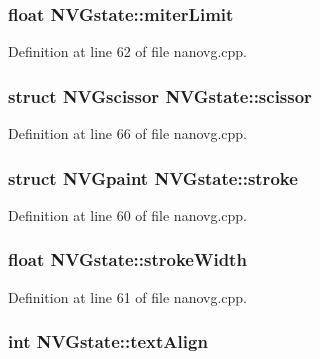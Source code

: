 \hypertarget{struct_n_v_gstate_a274ff13d3a13ed64b17f45eed44ff02a}{
\subsubsection[{miter\+Limit}]{\setlength{\rightskip}{0pt plus 5cm}float N\+V\+Gstate\+::miter\+Limit}}\label{struct_n_v_gstate_a274ff13d3a13ed64b17f45eed44ff02a}


Definition at line 62 of file nanovg.\+cpp.

\hypertarget{struct_n_v_gstate_a75bd77e78aa4304e0e019933fd3307ab}{
\subsubsection[{scissor}]{\setlength{\rightskip}{0pt plus 5cm}struct {\bf N\+V\+Gscissor} N\+V\+Gstate\+::scissor}}\label{struct_n_v_gstate_a75bd77e78aa4304e0e019933fd3307ab}


Definition at line 66 of file nanovg.\+cpp.

\hypertarget{struct_n_v_gstate_a0423f044a0ef4445270156232c88b340}{
\subsubsection[{stroke}]{\setlength{\rightskip}{0pt plus 5cm}struct {\bf N\+V\+Gpaint} N\+V\+Gstate\+::stroke}}\label{struct_n_v_gstate_a0423f044a0ef4445270156232c88b340}


Definition at line 60 of file nanovg.\+cpp.

\hypertarget{struct_n_v_gstate_a0266a3e8c86c689a7eba07cf1b8adac2}{
\subsubsection[{stroke\+Width}]{\setlength{\rightskip}{0pt plus 5cm}float N\+V\+Gstate\+::stroke\+Width}}\label{struct_n_v_gstate_a0266a3e8c86c689a7eba07cf1b8adac2}


Definition at line 61 of file nanovg.\+cpp.

\hypertarget{struct_n_v_gstate_a892bf3be3137e966108164c93730ce2b}{
\subsubsection[{text\+Align}]{\setlength{\rightskip}{0pt plus 5cm}int N\+V\+Gstate\+::text\+Align}}\label{struct_n_v_gstate_a892bf3be3137e966108164c93730ce2b}


